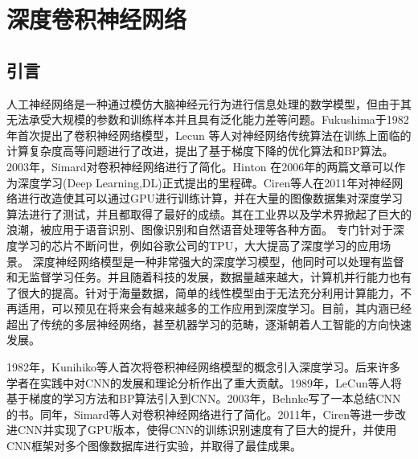\chapter{深度卷积神经网络}

\section{引言}


人工神经网络是一种通过模仿大脑神经元行为进行信息处理的数学模型，但由于其无法承受大规模的参数和训练样本并且具有泛化能力差等问题。Fukushima于1982年首次提出了卷积神经网络模型，Lecun 等人对神经网络传统算法在训练上面临的计算复杂度高等问题进行了改进，提出了基于梯度下降的优化算法和BP算法。2003年，Simard对卷积神经网络进行了简化。Hinton 在2006年的两篇文章可以作为深度学习(Deep Learning,DL)正式提出的里程碑。Ciren等人在2011年对神经网络进行改造使其可以通过GPU进行训练计算，并在大量的图像数据集对深度学习算法进行了测试，并且都取得了最好的成绩。其在工业界以及学术界掀起了巨大的浪潮，被应用于语音识别、图像识别和自然语音处理等各种方面。 专门针对于深度学习的芯片不断问世，例如谷歌公司的TPU，大大提高了深度学习的应用场景。
深度神经网络模型是一种非常强大的深度学习模型，他同时可以处理有监督和无监督学习任务。并且随着科技的发展，数据量越来越大，计算机并行能力也有了很大的提高。针对于海量数据，简单的线性模型由于无法充分利用计算能力，不再适用，可以预见在将来会有越来越多的工作应用到深度学习。目前，其内涵已经超出了传统的多层神经网络，甚至机器学习的范畴，逐渐朝着人工智能的方向快速发展。

1982年，Kunihiko等人首次将卷积神经网络模型的概念引入深度学习。后来许多学者在实践中对CNN的发展和理论分析作出了重大贡献。1989年，LeCun等人将基于梯度的学习方法和BP算法引入到CNN。2003年，Behnke写了一本总结CNN的书。同年，Simard等人对卷积神经网络进行了简化。2011年，Ciren等进一步改进CNN并实现了GPU版本，使得CNN的训练识别速度有了巨大的提升，并使用CNN框架对多个图像数据库进行实验，并取得了最佳成果。

